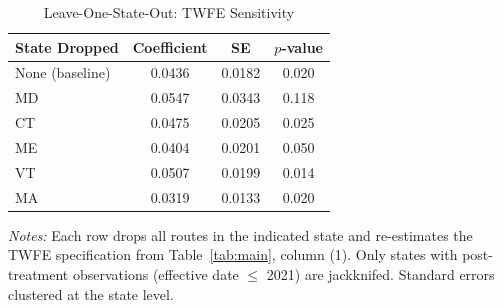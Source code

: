 \begin{table}[t]
\centering
\caption{Leave-One-State-Out: TWFE Sensitivity}
\label{tab:loso}
\begin{tabular}{lccc}
\toprule
State Dropped & Coefficient & SE & $p$-value \\
\midrule
None (baseline) & 0.0436 & 0.0182 & 0.020 \\
MD & 0.0547 & 0.0343 & 0.118 \\
CT & 0.0475 & 0.0205 & 0.025 \\
ME & 0.0404 & 0.0201 & 0.050 \\
VT & 0.0507 & 0.0199 & 0.014 \\
MA & 0.0319 & 0.0133 & 0.020 \\
\bottomrule
\end{tabular}
\begin{tablenotes}[flushleft]
\item \textit{Notes:} Each row drops all routes in the indicated state and re-estimates the TWFE specification from Table~\ref{tab:main}, column (1). Only states with post-treatment observations (effective date $\leq$ 2021) are jackknifed. Standard errors clustered at the state level.
\end{tablenotes}
\end{table}
